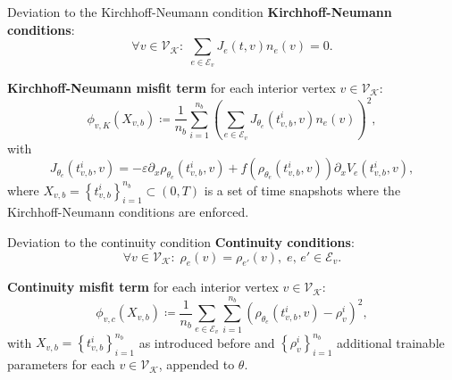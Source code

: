 \documentclass[9pt]{beamer}
\begin{document}
\begin{frame}{Deviation to the Kirchhoff-Neumann condition}
    \textbf{Kirchhoff-Neumann conditions}:
    \begin{equation*}
        \forall v \in \mathcal{V}_\mathcal{K} \colon \; \sum_{e\in \mathcal{E}_v} J_e \left( t,v \right)  n_e  \left( v \right) =0.
    \end{equation*}
    
    \vspace{3mm}

    \textbf{Kirchhoff-Neumann misfit term} for each interior vertex $v \in \mathcal{V}_{\mathcal{K}}$:
    \begin{equation*} 
        \phi_{v,K}  \left( X_{v,b} \right) \coloneqq \frac{1}{n_b} \sum_{i=1}^{n_b}  \left( \sum_{e \in \mathcal{E}_v}  J_{\theta_e}\left( t_{v,b}^i, v \right)  n_e  \left( v \right) \right)^2, 
    \end{equation*} 
    with 
    \begin{equation*} 
        J_{\theta_e}\left( t_{v,b}^i, v \right) = - \varepsilon \partial_x \rho_{\theta_e}  \left( t_{v,b}^i, v \right) + f \left( \rho_{\theta_e}  \left( t_{v,b}^i, v \right) \right) \partial_x V_e \left( t_{v,b}^i, v \right),
    \end{equation*}
    where $X_{v,b} = \left\{ t_{v,b}^i \right\}_{i=1}^{n_b} \subset \left( 0,T \right)$ is a set of time snapshots where the Kirchhoff-Neumann conditions are enforced.
\end{frame}



\begin{frame}{Deviation to the continuity condition}
    \textbf{Continuity conditions}:
    \begin{equation*}
        \forall v \in \mathcal{V}_\mathcal{K} \colon \; \rho_e \left( v \right)  = \rho_{e'} \left( v \right), \; e,\,e' \in \mathcal{E}_v.
    \end{equation*}

    \vspace{3mm}

    \textbf{Continuity misfit term} for each interior vertex $v \in \mathcal{V}_{\mathcal{K}}$:
    \begin{equation*} 
        \phi_{v,c}  \left( X_{v,b} \right) \coloneqq \frac{1}{n_b} \sum_{e \in \mathcal{E}_v} \sum_{i=1}^{n_b} \left(  \rho_{\theta_e}  \left( t_{v,b}^i, v \right) - \rho_{v}^i \right)^2,
    \end{equation*} 
    with $X_{v,b} = \left\{ t_{v,b}^i \right\}_{i=1}^{n_b}$ as introduced before and $\left\{ \rho_{v}^i \right\}_{i=1}^{n_b}$ additional trainable parameters for each $v \in \mathcal{V}_{\mathcal{K}}$, appended to $\theta$.
\end{frame}
\end{document}
